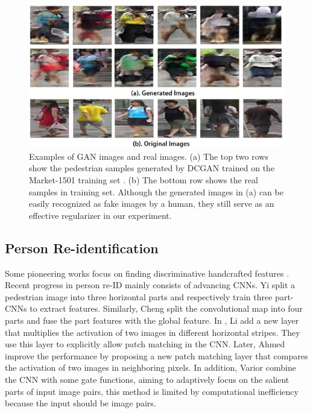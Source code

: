 \documentclass[10pt,twocolumn,letterpaper]{article}
\begin{document}
\begin{figure}[t]
\begin{center}
   \includegraphics[width=1\linewidth]{iccv_fig1.eps}
\end{center}
   \caption{Examples of GAN images and real images. (a) The top two rows show the pedestrian samples generated by DCGAN \cite{radford2015unsupervised} trained on the Market-1501 training set \cite{zheng2015scalable}. (b) The bottom row shows the real samples in training set. Although the generated images in (a) can be easily recognized as fake images by a human, they still serve as an effective regularizer in our experiment. }
\label{fig:imperfect}
\end{figure} 

\subsection{Person Re-identification}
Some pioneering works focus on finding discriminative handcrafted features \cite{ma2012bicov,ma2014covariance,liao2015person}. Recent progress in person re-ID mainly consists of advancing CNNs. Yi \etal \cite{yi2014deep} split a pedestrian image into three horizontal parts and respectively train three part-CNNs to extract features. Similarly, Cheng \etal \cite{cheng2016person} split the convolutional map into four parts and fuse the part features with the global feature. In \cite{li2014deepreid}, Li \etal add a new layer that multiplies the activation of two images in different horizontal stripes. They use this layer to explicitly allow patch matching in the CNN. Later, Ahmed \etal \cite{ahmed2015improved} improve the performance by proposing a new patch matching layer that compares the activation of two images in neighboring pixels. In addition, Varior \etal \cite{varior2016gated} combine the CNN with some gate functions, aiming to adaptively focus on the salient parts of input image pairs, this method is limited by computational inefficiency because the input should be image pairs. 
\end{document}
